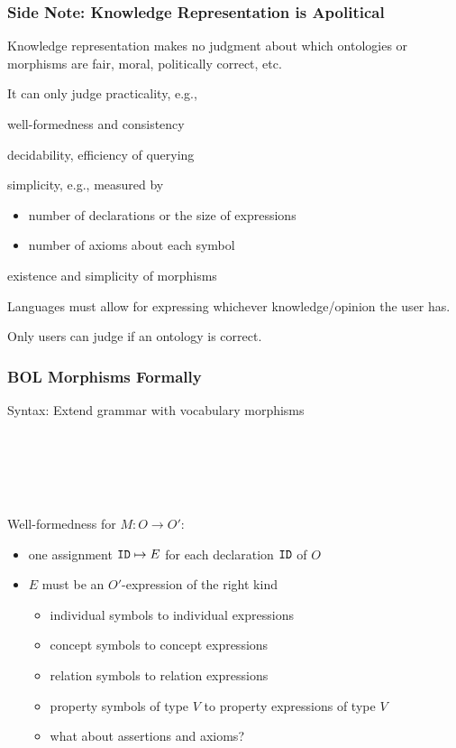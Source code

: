 \begin{frame}\frametitle{Side Note: Knowledge Representation is Apolitical}
Knowledge representation makes no judgment about which ontologies or morphisms are fair, moral, politically correct, etc.

\begin{blockitems}{It can only judge practicality, e.g.,}
\item well-formedness and consistency
\item decidability, efficiency of querying
\item simplicity, e.g., measured by
\begin{itemize}
\item number of declarations or the size of expressions
\item number of axioms about each symbol
\end{itemize}
\item existence and simplicity of morphisms
\end{blockitems}

Languages must allow for expressing whichever knowledge/opinion the user has.

Only users can judge if an ontology is correct.
\end{frame}

\begin{frame}\frametitle{BOL Morphisms Formally}
Syntax: Extend grammar with vocabulary morphisms
\begin{commgrammar}
\\
\\
\\
\\
\end{commgrammar}

Well-formedness for $M:O\to O'$:
\begin{itemize}
\item one assignment $\texttt{ID}\mapsto E$ for each declaration $\texttt{ID}$ of $O$
\item $E$ must be an $O'$-expression of the right kind
 \begin{itemize}
 \item individual symbols to individual expressions
 \item concept symbols to concept expressions
 \item relation symbols to relation expressions
 \item property symbols of type $V$ to property expressions of type $V$
 \item what about assertions and axioms? 
 \end{itemize}
\end{itemize}
\end{frame}

